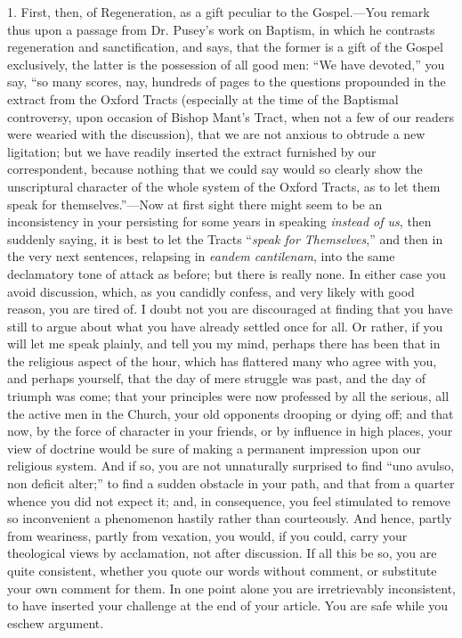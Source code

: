 1. First, then, of Regeneration, as a gift
peculiar to the Gospel.—You remark thus upon a passage from Dr.
Pusey's work on Baptism, in which he contrasts regeneration and
sanctification, and says, that the former is a gift of the Gospel
exclusively, the latter is the possession of all good men: ``We have
devoted,'' you say, ``so many scores, nay, hundreds of pages to the
questions propounded in the extract from the Oxford Tracts (especially
at the time of the Baptismal controversy, upon occasion of Bishop Mant's
Tract, when not a few of our readers were wearied with the
discussion), that we are not anxious to obtrude a new ligitation; but
we have readily inserted the extract furnished by our correspondent,
because nothing that we could say would so clearly show the
unscriptural character of the whole system of the Oxford Tracts, as to
let them speak for themselves.''—Now at first sight there might seem
to be an inconsistency in your persisting for some years in speaking \emph{instead
of us}, then suddenly saying, it is best to let the Tracts ``\emph{speak
for Themselves},'' and then in the very next sentences, relapsing in
\emph{eandem cantilenam}, into the same declamatory tone of attack as
before; but there is really none. In either case you avoid discussion,
which, as you candidly confess, and very likely with good reason, you
are tired of. I doubt not you are discouraged at finding that you have
still to argue about what you have already settled once for all. Or
rather, if you will let me speak plainly, and tell you my mind,
perhaps there has been that in the religious aspect of the hour, which
has flattered many who agree with you, and perhaps yourself, that the
day of mere struggle was past, and the day of triumph was come; that
your principles were now professed by all the serious, all the active
men in the Church, your old opponents drooping or dying off; and that
now, by the force of character in your friends, or by influence
in high places, your view of doctrine would be sure of making a
permanent impression upon our religious system. And if so, you are not
unnaturally surprised to find ``uno avulso, non deficit alter;'' to find
a sudden obstacle in your path, and that from a quarter whence you did
not expect it; and, in consequence, you feel stimulated to remove so
inconvenient a phenomenon hastily rather than courteously. And hence,
partly from weariness, partly from vexation, you would, if you could,
carry your theological views by acclamation, not after discussion. If
all this be so, you are quite consistent, whether you quote our words
without comment, or substitute your own comment for them. In one point
alone you are irretrievably inconsistent, to have inserted your
challenge at the end of your article. You are safe while you eschew
argument.


